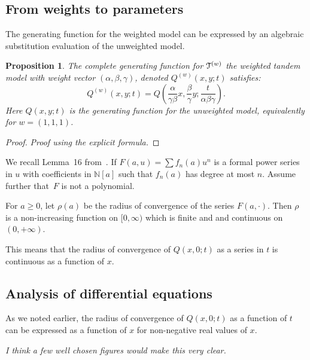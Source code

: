 \documentclass[11pt]{article}
\renewcommand{\geq}{\geqslant}
\newtheorem{proposition}[thm]{Proposition}
\newcommand\mjm[1]{\mbox{}
{\marginpar{\color{red!50}$\EuScript{M}$}}
{\it\noindent\color{red!50}#1}}%
\newcommand{\cT}{\EuScript{T}}
\begin{document}
\subsection{From weights to parameters}
The generating function for the weighted model can be expressed by an
algebraic substitution evaluation of the unweighted model. 

\begin{proposition} The complete generating function for $\cT^{(w)}$
  the weighted tandem model with weight vector $(\alpha, \beta,
  \gamma)$, denoted $Q^{(w)}(x,y;t)$ satisfies:
\begin{equation}
Q^{(w)}(x,y;t)=
Q\left(\frac{\alpha}{\gamma\beta}x,\frac{\beta}{\gamma}y;\frac{t}{\alpha\beta\gamma}\right).
\end{equation}
Here $Q(x,y;t)$ is the generating function for the unweighted model,
equivalently for $w=(1,1,1)$. 
\end{proposition}
\begin{proof}
\mjm{Proof using the explicit formula.}
\end{proof}

We recall Lemma~16 from~\cite{AlBo14}. If $F(a,u)=\sum f_n(a) u^n$ is
a formal power series in $u$ with coefficients in $\mathbb{N}[a]$ such
that $f_n(a)$ has degree at most $n$. Assume further that~$F$ is not a
polynomial.
 
For $a\geq 0$, let $\rho(a)$ be the radius of convergence of the
series $F(a, \cdot)$. Then $\rho$ is a non-increasing function on $[0,
\infty)$ which is finite and and continuous on $(0, +\infty)$. 

This means that the radius of convergence of $Q(x,0;t)$ as a series in
$t$ is continuous as a function of $x$.

\subsection{Analysis of differential equations}
\label{sec:WeightedDE}
As we noted earlier, the radius of convergence of $Q(x,0;t)$ as a
function of $t$ can be expressed as a function of $x$ for non-negative
real values of $x$.

\mjm{I think a few well chosen figures would make this very clear.}
\end{document}
